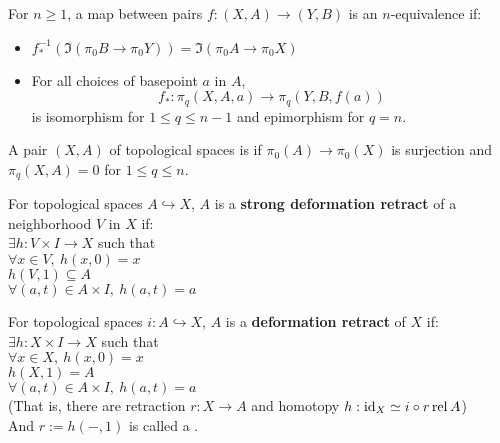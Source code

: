     \begin{defn}
        For $n \geq 1$, a map between pairs $f : (X,A) \to (Y,B)  $ is an $n$-equivalence
        if:
        \begin{itemize}
            \item $f_*^{-1}(\Im (\pi_0 B \to \pi_0 Y)) = \Im (\pi_0 A \to \pi_0 X)$
            \item For all choices of basepoint $a$ in $A$,
                $$
                f_* : \pi_q(X,A,a) \to \pi_q(Y,B,f(a))
                $$
                is isomorphism for $ 1 \leq q \leq n -1$ and epimorphism for $q = n$.
        \end{itemize}
        
    \end{defn}

    \begin{defn}
        A pair $(X,A)$ of topological spaces is 
        if $\pi_0(A) \to \pi_0(X)$ is surjection and $\pi_q(X,A) = 0$ for
        $1 \leq q \leq n$.
    \end{defn}

    \begin{defn}
        For topological spaces $A \hookrightarrow X$, 
        $A$ is a \textbf{strong deformation retract} of a neighborhood $V$ in $X$
        if:\\
        $\exists h : V \times I \to X$ such that\\
        $\forall x \in V,\ h(x,0) = x$\\
        $h(V,1) \subseteq A$\\
        $\forall (a,t) \in A \times I,\ h(a,t) = a$
    \end{defn}

    \begin{defn}
        For topological spaces $i : A \hookrightarrow X$, 
        $A$ is a \textbf{deformation retract} of $X$
        if:\\
        $\exists h : X \times I \to X$ such that\\
        $\forall x \in X,\ h(x,0) = x$\\
        $h(X,1) = A$\\
        $\forall (a,t) \in A \times I,\ h(a,t) = a$\\
        (That is, there are retraction $r : X \to A$ and homotopy $h : \mathrm{id}_X \simeq i \circ r \mathrm{\ \!rel\ \!} A$)\\
        And $r := h(-,1)$ is called a .
    \end{defn}

